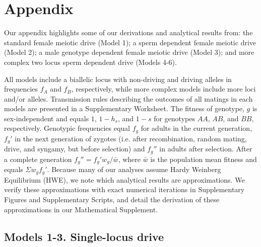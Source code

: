 \documentclass[12pt,letterpaper]{article}
\newcommand{\gc}[1]{{ \color{red} #1}}
\newcommand{\yb}[1]{{ \color{blue} #1}}
\begin{document}
\section*{Appendix}
Our appendix highlights some of our derivations and analytical results from: 
	the standard female meiotic drive (Model 1); a sperm
	dependent female meiotic drive (Model 2); a male genotype dependent
female meiotic drive (Model 3); and more complex two locus sperm
dependent drive (Models 4-6). %

All models include a biallelic locus with non-driving and driving alleles in frequencies $f_A$ and $f_B$, 
	respectively, while more complex models include more loci and/or alleles.  
Transmission rules describing the outcomes of all matings in each
	models are presented in a \yb{Supplementary Worksheet}. 
The fitness of genotype, $g$ is sex-independent and equals $1$, $1-h_s$, and $1-s$ for genotypes $AA$, $AB$, and $BB$, respectively. %
Genotypic frequencies  equal  $f_g$ for adults in the current generation, 
	$f_g'$ in the next generation of zygotes (i.e. after recombination, random mating, drive, and syngamy, but before selection)
	and $f_g''$ in adults after selection. 
After a complete generation $f_g'' = f_g' w_g/\bar{w}$, where $\bar{w}$ is the population mean fitness and equals $\Sigma w_g f_g'$. 
Because many of our analyses assume Hardy Weinberg Equilibrium (HWE), we note which analytical results are approximations. 
We verify these approximations with exact numerical iterations in Supplementary Figures and Supplementary Scripts, and detail the derivation of these approximations in our Mathematical Supplement. 



\subsection*{Models 1-3. Single-locus drive}
\end{document}

